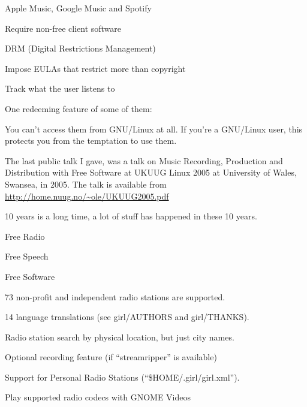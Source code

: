 \documentclass[20pt,landscape]{foils}
\begin{document}

\begin{list1}
\item Apple Music, Google Music and Spotify
  \begin{list2}
  \item Require non-free client software
  \item DRM (Digital Restrictions Management)
  \item Impose EULAs that restrict more than copyright
  \item Track what the user listens to
  \end{list2}
\end{list1}

One redeeming feature of some of them:

\begin{list2}
\item You can't access them from GNU/Linux at all.  If you're a GNU/Linux user, this protects you from the temptation to use them.
\end{list2}


The last public talk I gave, was a talk on Music Recording, Production and Distribution with Free Software at UKUUG Linux 2005 at University of Wales, Swansea, in 2005. The talk is available from \url{http://home.nuug.no/~ole/UKUUG2005.pdf}

10 years is a long time, a lot of stuff has happened in these 10 years.

\begin{list1}
\item Free Radio
\item Free Speech
\item Free Software
\end{list1}


\begin{list1}
\item 73 non-profit and independent radio stations are supported.
\item 14 language translations (see girl/AUTHORS and girl/THANKS).
\item Radio station search by physical location, but just city names.
\item Optional recording feature (if ``streamripper'' is available)
\item Support for Personal Radio Stations (``\$HOME/.girl/girl.xml'').
\item Play supported radio codecs with GNOME Videos
\end{list1}
\end{document}
